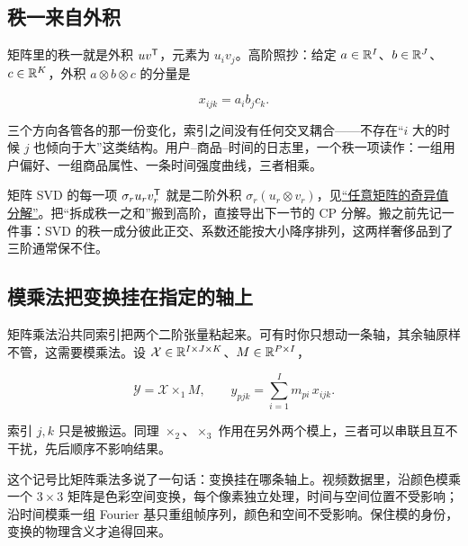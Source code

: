 \subsection{秩一来自外积}

矩阵里的秩一就是外积 \(uv^{\mathsf{T}}\)，元素为 \(u_iv_j\)。高阶照抄：给定 \(a\in\mathbb{R}^{I}\)、\(b\in\mathbb{R}^{J}\)、\(c\in\mathbb{R}^{K}\)，外积 \(a\otimes b\otimes c\) 的分量是

\[
x_{ijk}=a_ib_jc_k .
\]

三个方向各管各的那一份变化，索引之间没有任何交叉耦合——不存在``\(i\) 大的时候 \(j\) 也倾向于大''这类结构。用户--商品--时间的日志里，一个秩一项读作：一组用户偏好、一组商品属性、一条时间强度曲线，三者相乘。

矩阵 SVD 的每一项 \(\sigma_ru_rv_r^{\mathsf{T}}\) 就是二阶外积 \(\sigma_r(u_r\otimes v_r)\)，见\hyperref[sec:03-Linear-Algebra/07-SVD-and-Data-Applications/01]{``任意矩阵的奇异值分解''}。把``拆成秩一之和''搬到高阶，直接导出下一节的 CP 分解。搬之前先记一件事：SVD 的秩一成分彼此正交、系数还能按大小降序排列，这两样奢侈品到了三阶通常保不住。

\subsection{模乘法把变换挂在指定的轴上}

矩阵乘法沿共同索引把两个二阶张量粘起来。可有时你只想动一条轴，其余轴原样不管，这需要模乘法。设 \(\mathcal X\in\mathbb{R}^{I\times J\times K}\)、\(M\in\mathbb{R}^{P\times I}\)，

\[
\mathcal Y=\mathcal X\times_1 M,\qquad y_{pjk}=\sum_{i=1}^{I}m_{pi}\,x_{ijk}.
\]

索引 \(j,k\) 只是被搬运。同理 \(\times_2\)、\(\times_3\) 作用在另外两个模上，三者可以串联且互不干扰，先后顺序不影响结果。

这个记号比矩阵乘法多说了一句话：变换挂在哪条轴上。视频数据里，沿颜色模乘一个 \(3\times3\) 矩阵是色彩空间变换，每个像素独立处理，时间与空间位置不受影响；沿时间模乘一组 Fourier 基只重组帧序列，颜色和空间不受影响。保住模的身份，变换的物理含义才追得回来。

